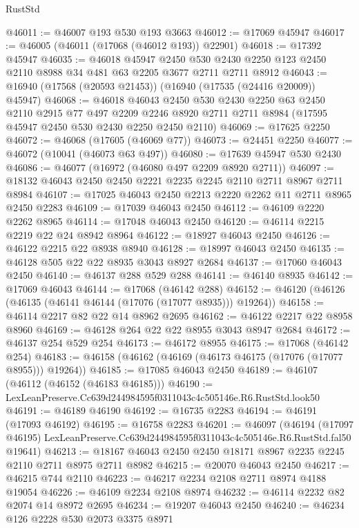 \begin{lexlean}{RustStd}
\begin{coremodule}
@46011 := @46007 @193 @530 @193 @3663
@46012 := @17069 @45947
@46017 := @46005 (@46011 (@17068 (@46012 @193)) @22901)
@46018 := @17392 @45947
@46035 := @46018
    @45947
    @2450
    @530
    @2430
    @2250
    @123
    @2450
    @2110
    @8988
    @34
    @481
    @63
    @2205
    @3677
    @2711
    @2711
    @8912
@46043 := @16940 (@17568 (@20593 @21453)) (@16940 (@17535 (@24416 @20009)) @45947)
@46068 := @46018
    @46043
    @2450
    @530
    @2430
    @2250
    @63
    @2450
    @2110
    @2915
    @77
    @497
    @2209
    @2246
    @8920
    @2711
    @2711
    @8984
    (@17595 @45947 @2450 @530 @2430 @2250 @2450 @2110)
@46069 := @17625 @2250
@46072 := @46068 (@17605 (@46069 @77))
@46073 := @24451 @2250
@46077 := @46072 (@10041 (@46073 @63 @497))
@46080 := @17639 @45947 @530 @2430
@46086 := @46077 (@16972 (@46080 @497 @2209 @8920 @2711))
@46097 := @18132 @46043 @2450 @2450 @2221 @2235 @2245 @2110 @2711 @8967 @2711 @8984
@46107 := @17025 @46043 @2450 @2213 @2220 @2262 @11 @2711 @8965 @2450 @2283
@46109 := @17039 @46043 @2450
@46112 := @46109 @2220 @2262 @8965
@46114 := @17048 @46043 @2450
@46120 := @46114 @2215 @2219 @22 @24 @8942 @8964
@46122 := @18927 @46043 @2450
@46126 := @46122 @2215 @22 @8938 @8940
@46128 := @18997 @46043 @2450
@46135 := @46128 @505 @22 @22 @8935 @3043 @8927 @2684
@46137 := @17060 @46043 @2450
@46140 := @46137 @288 @529 @288
@46141 := @46140 @8935
@46142 := @17069 @46043
@46144 := @17068 (@46142 @288)
@46152 := @46120 (@46126 (@46135 (@46141 @46144 (@17076 (@17077 @8935))) @19264))
@46158 := @46114 @2217 @82 @22 @14 @8962 @2695
@46162 := @46122 @2217 @22 @8958 @8960
@46169 := @46128 @264 @22 @22 @8955 @3043 @8947 @2684
@46172 := @46137 @254 @529 @254
@46173 := @46172 @8955
@46175 := @17068 (@46142 @254)
@46183 := @46158 (@46162 (@46169 (@46173 @46175 (@17076 (@17077 @8955))) @19264))
@46185 := @17085 @46043 @2450
@46189 := @46107 (@46112 (@46152 (@46183 @46185)))
@46190 := LexLeanPreserve.Cc639d244984595f0311043c4c505146e.R6.RustStd.look50
@46191 := @46189 @46190
@46192 := @16735 @2283
@46194 := @46191 (@17093 @46192)
@46195 := @16758 @2283
@46201 := @46097
    (@46194
      (@17097 @46195)
      LexLeanPreserve.Cc639d244984595f0311043c4c505146e.R6.RustStd.fal50
      @19641)
@46213 := @18167 @46043 @2450 @2450 @18171 @8967 @2235 @2245 @2110 @2711 @8975 @2711 @8982
@46215 := @20070 @46043 @2450
@46217 := @46215 @744 @2110
@46223 := @46217 @2234 @2108 @2711 @8974 @4188 @19054
@46226 := @46109 @2234 @2108 @8974
@46232 := @46114 @2232 @82 @2074 @14 @8972 @2695
@46234 := @19207 @46043 @2450
@46240 := @46234 @126 @2228 @530 @2073 @3375 @8971

\end{coremodule}
\end{lexlean}
